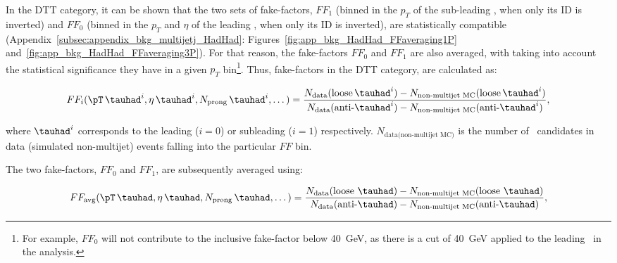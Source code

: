 In the DTT category, it can be shown that the two sets of fake-factors, $FF_1$ (binned
in the $p_T$ of the sub-leading \tauhad, when only its ID is inverted) and
$FF_0$ (binned in the $p_T$ and $\eta$ of the leading \tauhad, when only its ID is
inverted), are statistically compatible (Appendix~\ref{subsec:appendix_bkg_multijetj_HadHad}: Figures~\ref{fig:app_bkg_HadHad_FFaveraging1P} and~\ref{fig:app_bkg_HadHad_FFaveraging3P}). For that reason, the fake-factors $FF_0$ and $FF_1$ are also
averaged, with taking into account the statistical significance they have in a
given $p_T$ bin\footnote{For example, $FF_0$ will not contribute to the
  inclusive fake-factor below 40~GeV, as there is a cut of 40~GeV applied to the
  leading \tauhad\ in the analysis.}. Thus, fake-factors in the DTT category,
are calculated as:

\begin{equation}
  FF_i(\pT \, \tauhad^i, \eta \, \tauhad^i, N_\text{prong} \, \tauhad^i, \dots)
  = \frac{ N_{\text{data}}(\text{loose} \, \tauhad^i)-N_{\text{non-multijet MC}}(\text{loose} \, \tauhad^i) }
  { N_{\text{data}}(\text{anti-}\tauhad^i) - N_{\text{non-multijet MC}}(\text{anti-}\tauhad^i) },
  \label{eq:HH:hadhad:multijet:FFi}
\end{equation}

where $\tauhad^i$ corresponds to the leading ($i = 0$) or subleading \tauhad ($i
= 1$) respectively. $N_{\text{data(non-multijet MC)}}$ is the number of \tauhad\
candidates in data (simulated non-multijet) events falling into the particular
$FF$ bin.

The two fake-factors, $FF_0$ and $FF_1$, are subsequently averaged using:

\begin{equation}  
  FF_\text{avg}(\pT \, \tauhad,\eta \, \tauhad, N_\text{prong} \, \tauhad, \dots) = \frac{N_{\text{data}}\text{(loose \tauhad)}-N_{\text{non-multijet MC}}\text{(loose \tauhad)}}{N_{\text{data}}\text{(anti-\tauhad)}-N_{\text{non-multijet MC}}\text{(anti-\tauhad)}},
  \label{eq:HH:hadhad:multijet:FFavg}
\end{equation}

